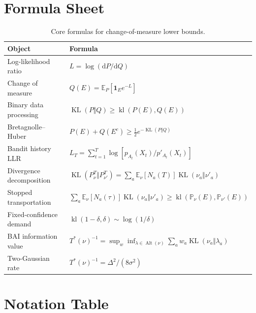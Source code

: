 \documentclass[en,nofont,11pt]{elegantbook}
\newcommand{\E}{\mathbb{E}}
\newcommand{\Pbb}{\mathbb{P}}
\newcommand{\one}{\mathbf{1}}
\newcommand{\KL}{\operatorname{KL}}
\newcommand{\kl}{\operatorname{kl}}
\newcommand{\dd}{\mathrm{d}}
\newcommand{\Alt}{\operatorname{Alt}}
\begin{document}
\chapter*{Formula Sheet}

\begin{table}[H]
\centering
\caption{Core formulas for change-of-measure lower bounds.}
\begin{tabular}{L{0.34\textwidth}L{0.57\textwidth}}
\toprule
Object & Formula \\
\midrule
Log-likelihood ratio & $L=\log(\dd P/\dd Q)$ \\
Change of measure & $Q(E)=\E_P[\one_Ee^{-L}]$ \\
Binary data processing & $\KL(P\Vert Q)\geq\kl(P(E),Q(E))$ \\
Bretagnolle--Huber & $P(E)+Q(E^c)\geq\tfrac12e^{-\KL(P\Vert Q)}$ \\
Bandit history LLR & $L_T=\sum_{t=1}^T\log[p_{A_t}(X_t)/p'_{A_t}(X_t)]$ \\
Divergence decomposition & $\KL(P_\nu^T\Vert P_{\nu'}^T)=\sum_a\E_\nu[N_a(T)]\KL(\nu_a\Vert\nu'_a)$ \\
Stopped transportation & $\sum_a\E_\nu[N_a(\tau)]\KL(\nu_a\Vert\nu'_a)\geq\kl(\Pbb_\nu(E),\Pbb_{\nu'}(E))$ \\
Fixed-confidence demand & $\kl(1-\delta,\delta)\sim\log(1/\delta)$ \\
BAI information value & $T^*(\nu)^{-1}=\sup_w\inf_{\lambda\in\Alt(\nu)}\sum_aw_a\KL(\nu_a\Vert\lambda_a)$ \\
Two-Gaussian rate & $T^*(\nu)^{-1}=\Delta^2/(8\sigma^2)$ \\
\bottomrule
\end{tabular}
\end{table}

\chapter*{Notation Table}
\end{document}
